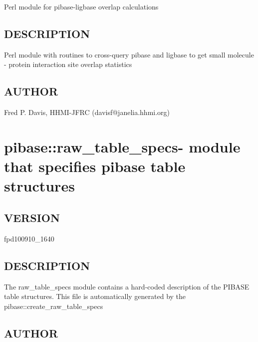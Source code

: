\documentclass{article}
\begin{document}
Perl module for pibase-ligbase overlap calculations

\subsection*{DESCRIPTION\label{pibase::pilig_DESCRIPTION}}


Perl module with routines to cross-query pibase and ligbase
to get small molecule - protein interaction site overlap
statistics

\subsection*{AUTHOR\label{pibase::pilig_AUTHOR}}


Fred P. Davis, HHMI-JFRC (davisf@janelia.hhmi.org)

\clearpage
\section{pibase::raw\_table\_specs- module that specifies pibase table structures\label{pibase::raw_table_specs-_module_that_specifies_pibase_table_structures}}




\subsection*{VERSION\label{pibase::raw_table_specs-_module_that_specifies_pibase_table_structures_VERSION}}


fpd100910\_1640

\subsection*{DESCRIPTION\label{pibase::raw_table_specs-_module_that_specifies_pibase_table_structures_DESCRIPTION}}


The raw\_table\_specs module contains a hard-coded description of the PIBASE
table structures. This file is automatically generated by the
pibase::create\_raw\_table\_specs

\subsection*{AUTHOR\label{pibase::raw_table_specs-_module_that_specifies_pibase_table_structures_AUTHOR}}
\end{document}
